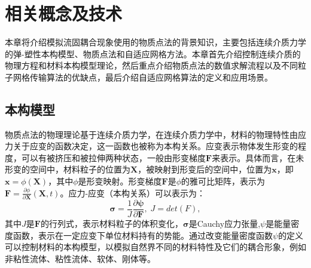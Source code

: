 \chapter{相关概念及技术} \label{chap:background}
本章将介绍模拟流固耦合现象使用的物质点法的背景知识，主要包括连续介质力学的弹-塑性本构模型、物质点法和自适应网格方法。本章首先介绍控制连续介质的物理方程和材料本构模型理论，然后重点介绍物质点法的数值求解流程以及不同粒子网格传输算法的优缺点，最后介绍自适应网格算法的定义和应用场景。

\section{本构模型}\label{sect:background:constitutive_model}
物质点法的物理理论基于连续介质力学，在连续介质力学中，材料的物理特性由应力关于应变的函数决定，这一函数也被称为本构关系。应变表示物体发生形变的程度，可以有被挤压和被拉伸两种状态，一般由形变梯度$\mathbf{F}$来表示。具体而言，在未形变的空间中，材料粒子的位置为$\mathbf{X}$，被映射到形变后的空间中，位置为$\mathbf{x}$，即$\mathbf{x} = \phi(\mathbf{X})$，其中$\phi$是形变映射。形变梯度$\mathbf{F}$是$\phi$的雅可比矩阵，表示为$\mathbf{F}=\frac{\partial \phi}{\partial \mathbf{X}}(\mathbf{X},t)$。应力-应变（本构关系）可以表示为：
\begin{equation}
    \mathbf{\sigma}=\frac{1}{J}\frac{\partial \mathbf{\psi}}{\partial \mathbf{F}}, \; 
    J = det(F),
\end{equation}
其中$J$是$\mathbf{F}$的行列式，表示材料粒子的体积变化，$\mathbf{\sigma}$是Cauchy应力张量,$\psi$是能量密度函数，表示在一定应变下单位材料持有的势能。通过改变能量密度函数$\psi$的定义可以控制材料的本构模型，以模拟自然界不同的材料特性及它们的耦合形象，例如非粘性流体、粘性流体、软体、刚体等。


